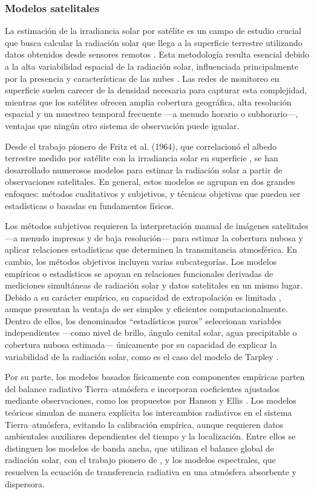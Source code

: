 \subsubsection{Modelos satelitales}

La estimación de la irradiancia solar por satélite es un campo de estudio crucial que busca calcular la radiación solar que llega a la superficie terrestre utilizando datos obtenidos desde sensores remotos \cite{Hay1993, ALONSOSUAREZ2012}. Esta metodología resulta esencial debido a la alta variabilidad espacial de la radiación solar, influenciada principalmente por la presencia y características de las nubes \cite{Laguarda2022}. Las redes de monitoreo en superficie suelen carecer de la densidad necesaria para capturar esta complejidad, mientras que los satélites ofrecen amplia cobertura geográfica, alta resolución espacial y un muestreo temporal frecuente —a menudo horario o subhorario—, ventajas que ningún otro sistema de observación puede igualar.

Desde el trabajo pionero de Fritz et al. (1964), que correlacionó el albedo terrestre medido por satélite con la irradiancia solar en superficie \cite{Fritz1964}, se han desarrollado numerosos modelos para estimar la radiación solar a partir de observaciones satelitales. En general, estos modelos se agrupan en dos grandes enfoques: métodos cualitativos y subjetivos, y técnicas objetivas que pueden ser estadísticas o basadas en fundamentos físicos.

Los métodos subjetivos requieren la interpretación manual de imágenes satelitales —a menudo impresas y de baja resolución— para estimar la cobertura nubosa y aplicar relaciones estadísticas que determinen la transmitancia atmosférica. En cambio, los métodos objetivos incluyen varias subcategorías. Los modelos empíricos o estadísticos se apoyan en relaciones funcionales derivadas de mediciones simultáneas de radiación solar y datos satelitales en un mismo lugar. Debido a su carácter empírico, su capacidad de extrapolación es limitada \cite{Laguarda2021}, aunque presentan la ventaja de ser simples y eficientes computacionalmente. Dentro de ellos, los denominados “estadísticos puros” seleccionan variables independientes —como nivel de brillo, ángulo cenital solar, agua precipitable o cobertura nubosa estimada— únicamente por su capacidad de explicar la variabilidad de la radiación solar, como es el caso del modelo de Tarpley \cite{Tarpley1979}.

Por su parte, los modelos basados físicamente con componentes empíricas parten del balance radiativo Tierra–atmósfera e incorporan coeficientes ajustados mediante observaciones, como los propuestos por Hanson \cite{Hanson1976} y Ellis \cite{Ellis1978}. Los modelos teóricos simulan de manera explícita los intercambios radiativos en el sistema Tierra–atmósfera, evitando la calibración empírica, aunque requieren datos ambientales auxiliares dependientes del tiempo y la localización. Entre ellos se distinguen los modelos de banda ancha, que utilizan el balance global de radiación solar, con el trabajo pionero de \cite{Gautier1980}, y los modelos espectrales, que resuelven la ecuación de transferencia radiativa en una atmósfera absorbente y dispersora.

